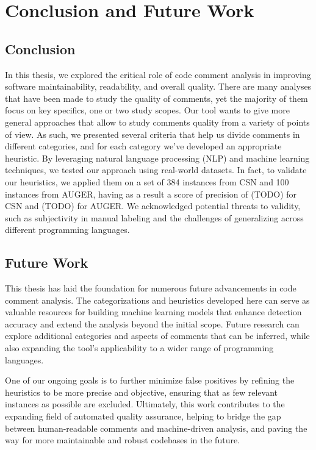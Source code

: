 
\chapter{Conclusion and Future Work} %

\label{Chapter5}


\section{Conclusion}
In this thesis, we explored the critical role of code comment analysis in improving software maintainability, readability, and overall quality. There are many analyses that have been made to study the quality of comments, yet the majority of them focus on key specifics, one or two study scopes. Our tool wants to give more general approaches that allow to study comments quality from a variety of points of view. As such, we presented several criteria that help us divide comments in different categories, and for each category we've developed an appropriate heuristic. By leveraging natural language processing (NLP) and machine learning techniques, we tested our approach using real-world datasets. In fact, to validate our heuristics, we applied them on a set of 384 instances from CSN and 100 instances from AUGER, having as a result a score of precision of (TODO) for CSN and (TODO) for AUGER. We acknowledged potential threats to validity, such as subjectivity in manual labeling and the challenges of generalizing across different programming languages.

\section{Future Work}
This thesis has laid the foundation for numerous future advancements in code comment analysis. The categorizations and heuristics developed here can serve as valuable resources for building machine learning models that enhance detection accuracy and extend the analysis beyond the initial scope. Future research can explore additional categories and aspects of comments that can be inferred, while also expanding the tool's applicability to a wider range of programming languages.

\noindent One of our ongoing goals is to further minimize false positives by refining the heuristics to be more precise and objective, ensuring that as few relevant instances as possible are excluded. Ultimately, this work contributes to the expanding field of automated quality assurance, helping to bridge the gap between human-readable comments and machine-driven analysis, and paving the way for more maintainable and robust codebases in the future.